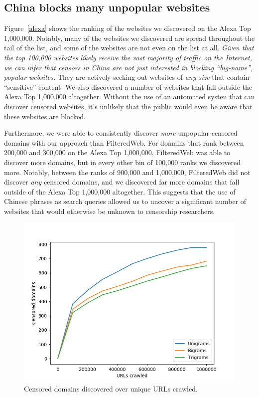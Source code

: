 \subsection{China blocks many unpopular websites}
Figure~\ref{alexa} shows the ranking of the websites we discovered on
the Alexa Top 1,000,000. Notably, many of the websites we discovered
are spread throughout the tail of the list, and some of the websites
are not even on the list at all. \textit{Given that the top 100,000 websites
likely receive the vast majority of traffic on the Internet, we can
infer that censors in China are not just interested in blocking
``big-name'', popular websites.} They are actively seeking out websites
of \textit{any size} that contain ``sensitive'' content. We also
discovered a number of websites that fall outside the Alexa Top
1,000,000 altogether. Without the use of an automated systen that can
discover censored websites, it's unlikely that the public would even
be aware that these websites are blocked.

Furthermore, we were able to consistently discover \textit{more} unpopular
censored domains with our approach than FilteredWeb. For domains that
rank between 200,000 and 300,000 on the Alexa Top 1,000,000,
FilteredWeb was able to discover more domains, but in every other bin of
100,000 ranks we discovered more. Notably, between the ranks of 900,000
and 1,000,000, FilteredWeb did not discover \textit{any} censored domains, and
we discovered far more domains that fall outside of the Alexa Top
1,000,000 altogether. This suggests that the use of Chinese phrases
as search queries allowed us to uncover a significant number of
websites that would otherwise be unknown to censorship researchers.

\begin{figure}[htb]
  \centering
  \includegraphics[scale=0.5]{figures/urls-crawled}
  \caption{\label{censored-vs-urls} Censored domains discovered over unique URLs crawled. }
\end{figure}

